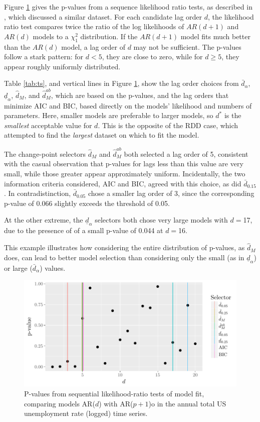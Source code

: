\documentclass[sts]{imsart}\usepackage[]{graphicx}\usepackage[]{color}
\makeatletter
\def\maxwidth{ %
  \ifdim\Gin@nat@width>\linewidth
    \linewidth
  \else
    \Gin@nat@width
  \fi
}
\newcommand{\dalphaU}{\bar{d}_\alpha}
\newcommand{\dalphaB}{\underline{d}_\alpha}
\newcommand{\dstar}{d^*}
\newcommand{\dhatU}{\bar{d}}
\newcommand{\dhatm}{\hat{d}_M}
\newcommand{\dhatmab}{\hat{d}^{ab}_M}
\makeatother
\begin{document}
Figure \ref{fig:tspvalues1} gives the p-values from a sequence
likelihood ratio tests, as described in \citet[][Ch.1]{urca}, which
discussed a similar dataset.
For each candidate lag order $d$, the likelihood ratio test compares
twice the ratio of the log likelihoods of $AR(d+1)$ and $AR(d)$ models
to a $\chi^2_1$ distribution.
If the $AR(d+1)$ model fits much better than the $AR(d)$ model, a lag
order of $d$ may not be sufficient.
The p-values follow a stark pattern: for $d<5$, they are close to
zero, while for $d\ge5$, they appear roughly uniformly distributed.

Table \ref{tab:ts}, and vertical lines in Figure \ref{fig:tspvalues1},
show the lag order choices from $\dalphaU$, $\dalphaB$, $\dhatm$, and
$\dhatmab$, which are based on the p-values, and the lag orders that
minimize AIC and BIC, based directly on the models' likelihood and numbers
of parameters.
Here, smaller models are preferable to larger models, so $\dstar$ is
the \emph{smallest} acceptable value for $d$.
This is the opposite of the RDD case, which attempted to find the
\emph{largest} dataset on which to fit the model.






The change-point selectors $\dhatm$ and $\dhatmab$ both selected a
lag order of 5, consistent with the casual
observation that p-values for lags less than this value are very
small, while those greater appear approximately uniform.
Incidentally, the two information criteria considered, AIC and BIC,
agreed with this choice, as did $\dhatU_{0.15}$.
In contradistinction, $\dhatU_{0.05}$ chose a smaller lag order of
3, since the corresponding p-value of
0.066 slightly exceeds the threshold of 0.05.

At the other extreme, the $\dalphaB$ selectors both chose very large
models with $d=$17, due to the presence of
of a small p-value of
0.044 at
$d=$16.

This example illustrates how considering the entire distribution of
p-values, as $\dhatm$ does, can lead to better model selection than
considering only the small (as in $\dalphaB$) or large ($\dalphaU$)
values.

\begin{figure}

\includegraphics[width=\maxwidth]{figure/tsResults-1} 

\caption{P-values from sequential likelihood-ratio tests of model fit,
  comparing models AR($d$) with AR($p+1$)o in the annual total US
  unemployment rate (logged) time series.}
\label{fig:tspvalues1}
\end{figure}
\end{document}
